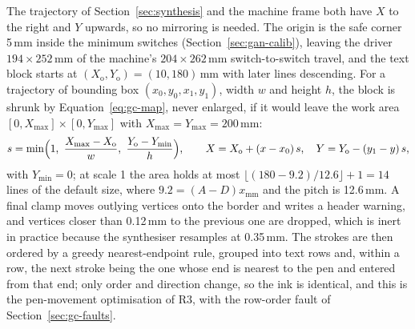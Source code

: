 The trajectory of Section~\ref{sec:synthesis} and the machine frame both have $X$ to the right and $Y$ upwards, so no mirroring is needed.
The origin is the safe corner 5\,mm inside the minimum switches (Section~\ref{sec:gan-calib}), leaving the driver $194\times252$\,mm of the machine's $204\times262$\,mm switch-to-switch travel, and the text block starts at $(X_{\mathrm o},Y_{\mathrm o})=(10,180)$\,mm with later lines descending.
For a trajectory of bounding box $(x_0,y_0,x_1,y_1)$, width $w$ and height $h$, the block is shrunk by Equation~\ref{eq:gc-map}, never enlarged, if it would leave the work area $[0,X_{\max}]\times[0,Y_{\max}]$ with $X_{\max}=Y_{\max}=200$\,mm:
\begin{equation}
s=\min\Bigl(1,\ \frac{X_{\max}-X_{\mathrm o}}{w},\ \frac{Y_{\mathrm o}-Y_{\min}}{h}\Bigr),\qquad X=X_{\mathrm o}+(x-x_0)\,s,\quad Y=Y_{\mathrm o}-(y_1-y)\,s,
\label{eq:gc-map}
\end{equation}
with $Y_{\min}=0$; at scale 1 the area holds at most $\lfloor(180-9.2)/12.6\rfloor+1=14$ lines of the default size, where $9.2=(A-D)x_{\mathrm{mm}}$ and the pitch is 12.6\,mm.
A final clamp moves outlying vertices onto the border and writes a header warning, and vertices closer than 0.12\,mm to the previous one are dropped, which is inert in practice because the synthesiser resamples at 0.35\,mm.
The strokes are then ordered by a greedy nearest-endpoint rule, grouped into text rows and, within a row, the next stroke being the one whose end is nearest to the pen and entered from that end; only order and direction change, so the ink is identical, and this is the pen-movement optimisation of R3, with the row-order fault of Section~\ref{sec:gc-faults}.

